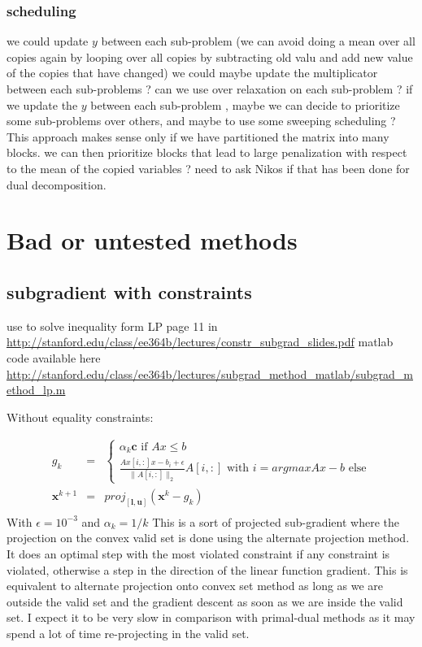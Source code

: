 \documentclass[11pt]{article}
\begin{document}
\subsubsection{scheduling}

we could update $y$ between each sub-problem (we can avoid doing a mean over all copies again by looping over all copies by subtracting old valu and add new value of the copies that have changed)
we could maybe update the multiplicator between each sub-problems ? 
can we use over relaxation on each sub-problem ? 
if we update the $y$ between each sub-problem , maybe we can decide to prioritize some sub-problems over others, and maybe to use some sweeping scheduling ? 
This approach makes sense only if we have partitioned the matrix into many blocks. we can then prioritize blocks that lead to large penalization with respect to the mean of the copied variables ? 
need to ask Nikos if that has been done for dual decomposition.


\section{Bad or untested methods}


\subsection{subgradient with constraints}
use to solve inequality form LP
page 11 in \url{http://stanford.edu/class/ee364b/lectures/constr_subgrad_slides.pdf}
matlab code available here \url{http://stanford.edu/class/ee364b/lectures/subgrad_method_matlab/subgrad_method_lp.m}

Without equality constraints:

\begin{eqnarray}
g_k&=&\left\{
\begin{array}{l}
\alpha_k \mathbf{c}\text{ if }Ax\leq b\\
\frac{Ax[i,:]x-b_i+\epsilon}{\|A[i,:]\|_2} A[i,:] \text{ with }i = argmax Ax- b\text{ else}
\end{array}
\right.\\
\mathbf{x}^{k+1}&=&proj_{[\mathbf{l},\mathbf{u}]} (\mathbf{x}^k- g_k)\\
\end{eqnarray}
With $\epsilon=10^{-3}$ and $\alpha_k=1/k$
This is a sort of projected sub-gradient where the projection on the convex valid set is done using the alternate projection method. It does an optimal step with the most violated constraint if any constraint is violated, otherwise a step in the direction of the linear function gradient. This is equivalent to alternate projection onto convex set method as long as we are outside the valid set and the gradient descent as soon as we are inside the valid set. I expect it to be very slow in comparison with primal-dual methods as it may spend a lot of time re-projecting in the valid set.
\end{document}
